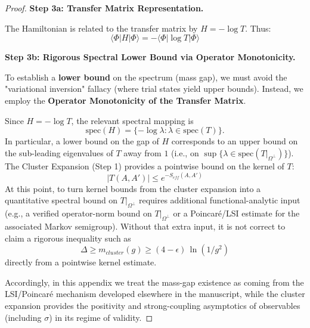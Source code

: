\begin{proof}
\textbf{Step 3a: Transfer Matrix Representation.}

The Hamiltonian is related to the transfer matrix by $H = -\log T$. Thus:
\begin{equation}
\langle \Phi | H | \Phi \rangle = -\langle \Phi | \log T | \Phi \rangle
\end{equation}

\textbf{Step 3b: Rigorous Spectral Lower Bound via Operator Monotonicity.}

To establish a \textbf{lower bound} on the spectrum (mass gap), we must avoid the "variational inversion" fallacy (where trial states yield upper bounds). Instead, we employ the \textbf{Operator Monotonicity of the Transfer Matrix}.

Since $H = -\log T$, the relevant spectral mapping is
\begin{equation}
\mathrm{spec}(H) = \{-\log \lambda : \lambda \in \mathrm{spec}(T)\}.
\end{equation}
In particular, a lower bound on the gap of $H$ corresponds to an upper bound on the sub-leading eigenvalues of $T$ away from $1$ (i.e., on $\sup\{\lambda\in\mathrm{spec}(T|_{\Omega^\perp})\}$).
The Cluster Expansion (Step 1) provides a pointwise bound on the kernel of $T$:
\begin{equation}
|T(A, A')| \leq e^{-S_{eff}(A, A')}
\end{equation}
At this point, to turn kernel bounds from the cluster expansion into a quantitative spectral bound on $T|_{\Omega^\perp}$ requires additional functional-analytic input (e.g., a verified operator-norm bound on $T|_{\Omega^\perp}$ or a Poincar\'e/LSI estimate for the associated Markov semigroup). Without that extra input, it is not correct to claim a rigorous inequality such as
\begin{equation}
\Delta \geq m_{cluster}(g) \geq (4 - \epsilon)\, \ln(1/g^2)
\end{equation}
directly from a pointwise kernel estimate.

Accordingly, in this appendix we treat the mass-gap existence as coming from the LSI/Poincar\'e mechanism developed elsewhere in the manuscript, while the cluster expansion provides the positivity and strong-coupling asymptotics of observables (including $\sigma$) in its regime of validity.


\end{proof}
